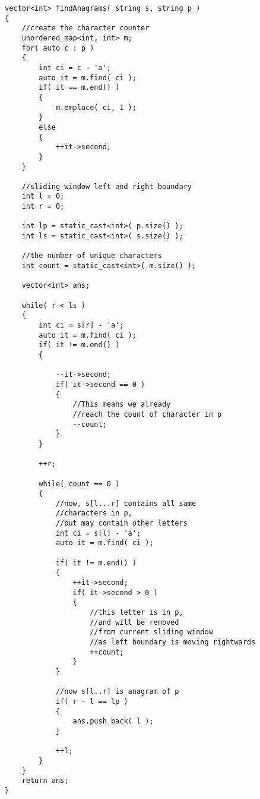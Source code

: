 \setcounter{lstlisting}{0}
\begin{lstlisting}[style=customc, caption={Sliding Window}]
vector<int> findAnagrams( string s, string p )
{
    //create the character counter
    unordered_map<int, int> m;
    for( auto c : p )
    {
        int ci = c - 'a';
        auto it = m.find( ci );
        if( it == m.end() )
        {
            m.emplace( ci, 1 );
        }
        else
        {
            ++it->second;
        }
    }

    //sliding window left and right boundary
    int l = 0;
    int r = 0;

    int lp = static_cast<int>( p.size() );
    int ls = static_cast<int>( s.size() );

    //the number of unique characters
    int count = static_cast<int>( m.size() );

    vector<int> ans;

    while( r < ls )
    {
        int ci = s[r] - 'a';
        auto it = m.find( ci );
        if( it != m.end() )
        {

            --it->second;
            if( it->second == 0 )
            {
                //This means we already
                //reach the count of character in p
                --count;
            }
        }

        ++r;

        while( count == 0 )
        {
            //now, s[l...r] contains all same
            //characters in p,
            //but may contain other letters
            int ci = s[l] - 'a';
            auto it = m.find( ci );

            if( it != m.end() )
            {
                ++it->second;
                if( it->second > 0 )
                {
                    //this letter is in p,
                    //and will be removed
                    //from current sliding window
                    //as left boundary is moving rightwards
                    ++count;
                }
            }

            //now s[l..r] is anagram of p
            if( r - l == lp )
            {
                ans.push_back( l );
            }

            ++l;
        }
    }
    return ans;
}
\end{lstlisting}